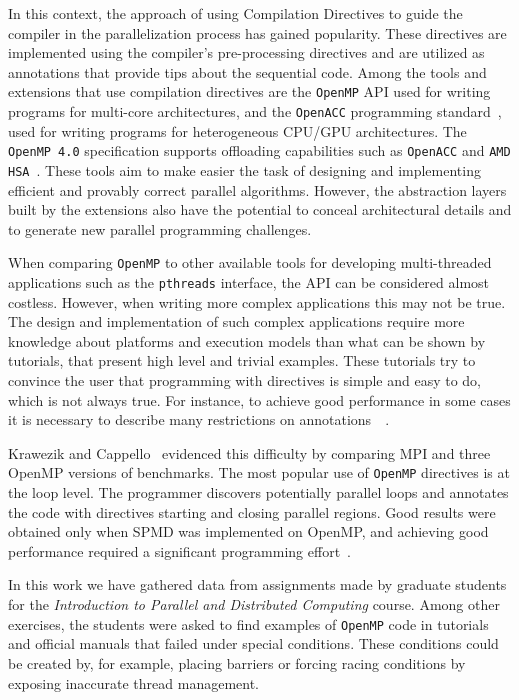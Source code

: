 In this context, the approach of using Compilation Directives to guide the compiler in the parallelization process has gained popularity. These directives are implemented using the compiler's pre-processing directives and are utilized as annotations that provide tips about the sequential code. Among the tools and extensions that use compilation directives are the \texttt{OpenMP} API \cite{Dagum1998a} \cite{Chapman:2007} used for writing programs for multi-core architectures, and the \texttt{OpenACC} programming standard~\cite{openacc:api}, used for writing programs for heterogeneous CPU/GPU architectures. The \texttt{OpenMP 4.0} specification supports offloading capabilities \cite{openmp:api:2013} such as \texttt{OpenACC} and \texttt{AMD HSA}~\cite{amd:hsa:site}. These tools aim to make easier the task of designing and implementing efficient and provably correct parallel algorithms. However, the abstraction layers built by the extensions also have the potential to conceal architectural details and to generate new parallel programming challenges.

When comparing \texttt{OpenMP} to other available tools for developing multi-threaded applications such as the \texttt{pthreads} interface, the API can be considered almost costless. However, when writing more complex applications this may not be true. The design and implementation of such complex applications require more knowledge about platforms and execution models than what can be shown by tutorials, that present high level and trivial examples. These tutorials try to convince the user that programming with directives is simple and easy to do, which is not always true. For instance, to achieve good performance in some cases it is necessary to describe many restrictions on annotations~\cite{OpenMPTasks2009}~\cite{mattson2003good}.

Krawezik and Cappello~\cite{CPE:CPE905} evidenced this difficulty by comparing MPI and three OpenMP versions of benchmarks. The most popular use of \texttt{OpenMP} directives is at the loop level. The programmer discovers potentially parallel loops and annotates the code with directives starting and closing parallel regions. Good results were obtained only when SPMD was implemented on OpenMP, and achieving good performance required a significant programming effort~\cite{CPE:CPE905}.

In this work we have gathered data from assignments made by graduate students for the \emph{Introduction to Parallel and Distributed Computing} course. Among other exercises, the students were asked to find examples of \texttt{OpenMP} code in tutorials and official manuals that failed under special conditions. These conditions could be created by, for example, placing barriers or forcing racing conditions by exposing inaccurate thread management.

